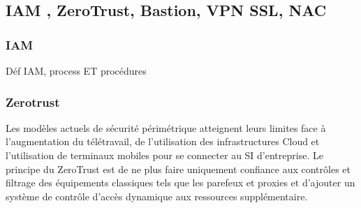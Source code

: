 \subsection{IAM , ZeroTrust, Bastion, VPN SSL, NAC}
\subsubsection{IAM}
Déf IAM, process ET procédures

\subsubsection{Zerotrust}
Les modèles actuels de sécurité périmétrique atteignent leurs limites face à l'augmentation du télétravail, de l'utilisation des infrastructures Cloud et l'utilisation de terminaux mobiles pour se connecter au SI d'entreprise.
Le principe du ZeroTrust est de ne plus faire uniquement confiance aux contrôles et filtrage des équipements classiques tels que les parefeux et proxies et d'ajouter un système de contrôle d'accès dynamique aux ressources supplémentaire.



